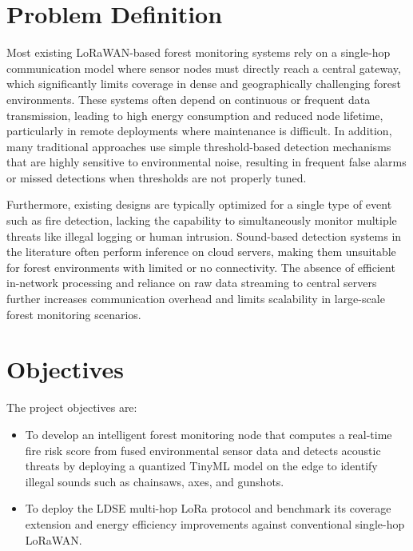 \section{Problem Definition}

Most existing LoRaWAN-based forest monitoring systems rely on a single-hop
communication model where sensor nodes must directly reach a central gateway, which
significantly limits coverage in dense and geographically challenging forest
environments. These systems often depend on continuous or frequent data
transmission, leading to high energy consumption and reduced node lifetime,
particularly in remote deployments where maintenance is difficult. In addition, many
traditional approaches use simple threshold-based detection mechanisms that are
highly sensitive to environmental noise, resulting in frequent false alarms or
missed detections when thresholds are not properly tuned.

Furthermore, existing designs are typically optimized for a single type of event
such as fire detection, lacking the capability to simultaneously monitor multiple
threats like illegal logging or human intrusion. Sound-based detection systems in
the literature often perform inference on cloud servers, making them unsuitable for
forest environments with limited or no connectivity. The absence of efficient
in-network processing and reliance on raw data streaming to central servers further
increases communication overhead and limits scalability in large-scale forest
monitoring scenarios.

\section{Objectives}
The project objectives are:
\begin{itemize}
  \item To develop an intelligent forest monitoring node that computes a
  real-time fire risk score from fused environmental sensor data and detects
  acoustic threats by deploying a quantized TinyML model on the edge to
  identify illegal sounds such as chainsaws, axes, and gunshots.
  \item To deploy the LDSE multi-hop LoRa protocol and benchmark its coverage
  extension and energy efficiency improvements against conventional single-hop
  LoRaWAN.
\end{itemize}

